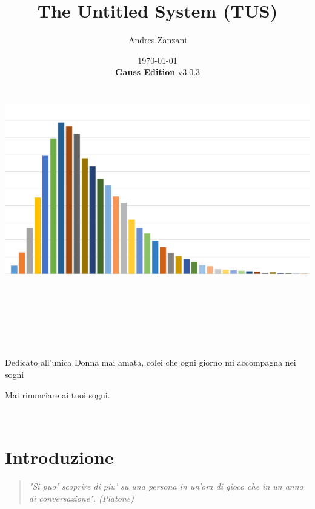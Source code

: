 \documentclass[a4paper,11pt,twoside,openany]{book}
\begin{document}
\title{The Untitled System (TUS)}
\date{\today\\\textbf{Gauss Edition} v3.0.3\\\includegraphics[width=6.85139in,height=3.79514in]{copertina.png}}
\author{Andres Zanzani}
\maketitle
\thispagestyle{empty}

\newpage~\newpage~




Dedicato all'unica Donna mai amata, colei che ogni giorno mi accompagna nei sogni

Mai rinunciare ai tuoi sogni.
\thispagestyle{empty}

\newpage~\thispagestyle{empty}%

\setcounter{page}{0}

\begin{multicols}{2}
\tableofcontents{}
\end{multicols}

\pagebreak{}

\section{Introduzione}

\pagestyle{plain} 
\begin{quote}\textit{"Si puo' scoprire di piu' su una persona in un'ora di gioco che in un anno di conversazione". (Platone)
}\end{quote}
\end{document}
